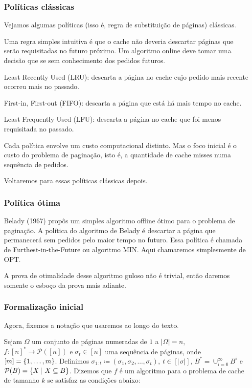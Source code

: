 \documentclass[a4paper,oneside,reqno,12pt]{amsart}
\begin{document}
\subsubsection{Políticas clássicas}

Vejamos algumas políticas (isso é, regra de substituição de páginas) clássicas. 

Uma regra simples intuitiva é que o cache não deveria descartar páginas que serão requisitadas no futuro próximo. Um algoritmo online deve tomar uma decisão que se  sem conhecimento dos pedidos futuros. 

Least Recently Used (LRU): descarta a página no cache cujo pedido mais recente ocorreu mais no passado.

First-in, First-out (FIFO): descarta a página que está há mais tempo no cache.

Least Frequently Used (LFU): descarta a página no cache que foi menos requisitada no passado.

Cada política envolve um custo computacional distinto. Mas o foco inicial é o custo do problema de paginação, isto é, a quantidade de cache misses numa sequência de pedidos.

Voltaremos para essas políticas clássicas depois.

\subsubsection{Política ótima}

Belady (1967) propôs um simples algoritmo offline ótimo para o problema de paginação. A política do algoritmo de Belady é descartar a página que permanecerá sem pedidos pelo maior tempo no futuro. Essa política é chamada de Furthest-in-the-Future ou algoritmo MIN. Aqui chamaremos simplesmente de OPT.

A prova de otimalidade desse algoritmo guloso não é trivial, então daremos somente o esboço da prova mais adiante.

\subsubsection{Formalização inicial}

Agora, fixemos a notação que usaremos ao longo do texto.

Sejam $\Omega$ um conjunto de páginas numeradas de $1$ a $|\Omega|=n$, $f: [n]^{*} \to \mathcal{P}([n])$ e $\sigma_t \in [n]$ uma sequência de páginas, onde $[m] = \{1, \dotsc ,m\}$. Definimos $\sigma_{1:t} \coloneqq (\sigma_1, \sigma_2, \dots, \sigma_t),\ t \in [|\sigma|]$, $B^{*} = \cup_{i=0}^{\infty} B^{i}$ e $\mathcal{P}(B) = \{ X \mid X \subseteq B \}$. Dizemos que $f$ é um algoritmo para o problema de cache de tamanho $k$ se satisfaz as condições abaixo:
\end{document}
